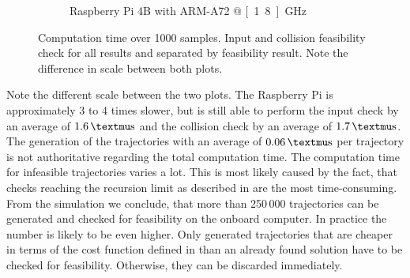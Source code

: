 \begin{figure}
\begin{subfigure}[b]{0.49\textwidth}
	\caption{Raspberry Pi 4B with ARM-A72 @ \unit[1.8]{GHz}}
	\label{fig:computation-time-pi}
	\end{subfigure}
	\caption{Computation time over 1000 samples. Input and collision feasibility check for all results and separated by feasibility result. Note the difference in scale between both plots.}
	\label{fig:computation-time}
\end{figure}
Note the different scale between the two plots.
The Raspberry Pi is approximately 3 to 4 times slower, but is still able to perform the input check by an average of $\unit[1.6]{µs}$ and the collision check by an average of $\unit[1.7]{µs}$.
The generation of the trajectories with an average of $\unit[0.06]{µs}$ per trajectory is not authoritative regarding the total computation time.
The computation time for infeasible trajectories varies a lot.
This is most likely caused by the fact, that checks reaching the recursion limit as described in  are the most time-consuming.
From the simulation we conclude, that more than 250\,000 trajectories can be generated and checked for feasibility on the onboard computer. In practice the number is likely to be even higher.
Only generated trajectories that are cheaper in terms of the cost function defined in  than an already found solution have to be checked for feasibility. Otherwise, they can be discarded immediately.




